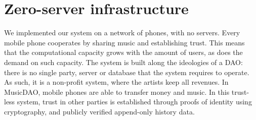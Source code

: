 \section{Zero-server infrastructure}
We implemented our system on a network of phones, with no servers. Every mobile phone cooperates by sharing music and establishing trust. This means that the computational capacity grows with the amount of users, as does the demand on such capacity. The system is built along the ideologies of a DAO: there is no single party, server or database that the system requires to operate. As such, it is a non-profit system, where the artists keep all revenues. In MusicDAO, mobile phones are able to transfer money and music. In this trust-less system, trust in other parties is established through proofs of identity using cryptography, and publicly verified append-only history data.

